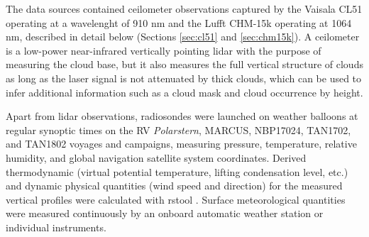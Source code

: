 \documentclass[12pt,a4paper]{article}
\begin{document}
The data sources contained ceilometer observations captured by the Vaisala CL51
operating at a wavelenght of 910 nm and the Lufft CHM-15k operating at
1064 nm, described in detail below (Sections \ref{sec:cl51} and
\ref{sec:chm15k}). A ceilometer is a low-power near-infrared vertically
pointing lidar with the purpose of measuring the cloud base, but it also
measures the full vertical structure of clouds as long as the laser signal is
not attenuated by thick clouds, which can be used to infer additional
information such as a cloud mask and cloud occurrence by height.

Apart from lidar observations, radiosondes were launched on weather balloons at
regular synoptic times on the RV \emph{Polarstern}, MARCUS, NBP17024, TAN1702,
and TAN1802 voyages and campaigns, measuring pressure, temperature, relative
humidity, and global navigation satellite system coordinates. Derived
thermodynamic (virtual potential temperature, lifting condensation level, etc.)
and dynamic physical quantities (wind speed and direction) for the measured
vertical profiles were calculated with rstool \citep{rstool}. Surface
meteorological quantities were measured continuously by an onboard automatic
weather station or individual instruments.
\end{document}
